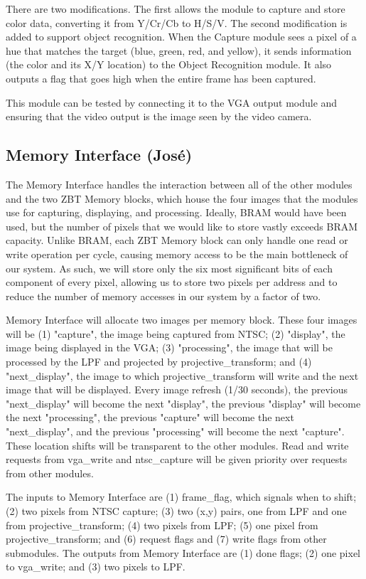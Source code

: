 \documentclass[10pt]{article}
\begin{document}
There are two modifications. The first allows the module to capture and store color data, converting it from Y/Cr/Cb to H/S/V. The second modification is added to support object recognition. When the Capture module sees a pixel of a hue that matches the target (blue, green, red, and yellow), it sends information (the color and its X/Y location) to the Object Recognition module. It also outputs a flag that goes high when the entire frame has been captured.

This module can be tested by connecting it to the VGA output module and ensuring that the video output is the image seen by the video camera.

\subsection{Memory Interface (Jos\'{e})}
The Memory Interface handles the interaction between all of the other modules and the two ZBT Memory blocks, which house the four images that the modules use for capturing, displaying, and processing. Ideally, BRAM would have been used, but the number of pixels that we would like to store vastly exceeds BRAM capacity. Unlike BRAM, each ZBT Memory block can only handle one read or write operation per cycle, causing memory access to be the main bottleneck of our system. As such, we will store only the six most significant bits of each component of every pixel, allowing us to store two pixels per address and to reduce the number of memory accesses in our system by a factor of two.

Memory Interface will allocate two images per memory block. These four images will be (1) "capture", the image being captured from NTSC; (2) "display", the image being displayed in the VGA; (3) "processing", the image that will be processed by the LPF and projected by projective\_transform; and (4) "next\_display", the image to which projective\_transform will write and the next image that will be displayed. Every image refresh (1/30 seconds), the previous "next\_display" will become the next "display", the previous "display" will become the next "processing", the previous "capture" will become the next "next\_display", and the previous "processing" will become the next "capture". These location shifts will be transparent to the other modules. Read and write requests from vga\_write and ntsc\_capture will be given priority over requests from other modules.

The inputs to Memory Interface are (1) frame\_flag, which signals when to shift; (2) two pixels from NTSC capture; (3) two (x,y) pairs, one from LPF and one from projective\_transform; (4) two pixels from LPF; (5) one pixel from projective\_transform; and (6) request flags and (7) write flags from other submodules. The outputs from Memory Interface are (1) done flags; (2) one pixel to vga\_write; and (3) two pixels to LPF.
\end{document}
